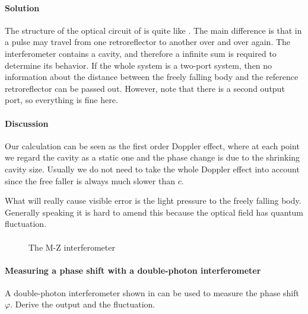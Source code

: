 \documentclass[hyperref, a4paper]{article}
\begin{document}
\paragraph{Solution} The structure of the optical circuit of  is quite like .
The main difference is that in  a pulse may travel from one retroreflector to another over and over again.
The interferometer contains a cavity, and therefore a infinite sum is required to determine its behavior.
If the whole system is a two-port system, then no information about the distance between the freely falling body and the reference retroreflector can be passed out.
However, note that there is a second output port, so everything is fine here.

\paragraph{Discussion} Our calculation can be seen as the first order Doppler effect, 
where at each point we regard the cavity as a static one and the phase change is due to the shrinking cavity size.
Usually we do not need to take the whole Doppler effect into account since the free faller is always much slower than $c$.

What will really cause visible error is the light pressure to the freely falling body.
Generally speaking it is hard to amend this because the optical field has quantum fluctuation.

\paragraph{}

\begin{figure}
    
    \caption{The M-Z interferometer}
    \label{fig:mz-interferometer}    
\end{figure}

\paragraph{Measuring a phase shift with a double-photon interferometer} A double-photon interferometer shown in  can be used to measure the phase shift $\varphi$.
Derive the output and the fluctuation.
\end{document}
